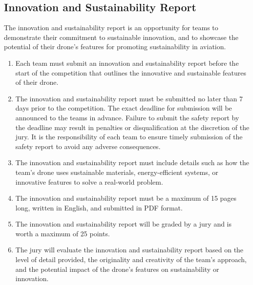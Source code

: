     \subsection{Innovation and Sustainability Report}
    The innovation and sustainability report is an opportunity for teams to demonstrate their commitment to sustainable innovation, and to showcase the potential of their drone's features for promoting sustainability in aviation.
    \begin{enumerate}
    \item Each team must submit an innovation and sustainability report before the start of the competition that outlines the innovative and sustainable features of their drone.
    \item The innovation and sustainability report must be submitted no later than 7 days prior to the competition. The exact deadline for submission will be announced to the teams in advance. Failure to submit the safety report by the deadline may result in penalties or disqualification at the discretion of the jury. It is the responsibility of each team to ensure timely submission of the safety report to avoid any adverse consequences.
    \item The innovation and sustainability report must include details such as how the team's drone uses sustainable materials, energy-efficient systems, or innovative features to solve a real-world problem.
    \item The innovation and sustainability report must be a maximum of 15 pages long, written in English, and submitted in PDF format.
    \item The innovation and sustainability report will be graded by a jury and is worth a maximum of 25 points.
    \item The jury will evaluate the innovation and sustainability report based on the level of detail provided, the originality and creativity of the team's approach, and the potential impact of the drone's features on sustainability or innovation.
    \end{enumerate}
    
